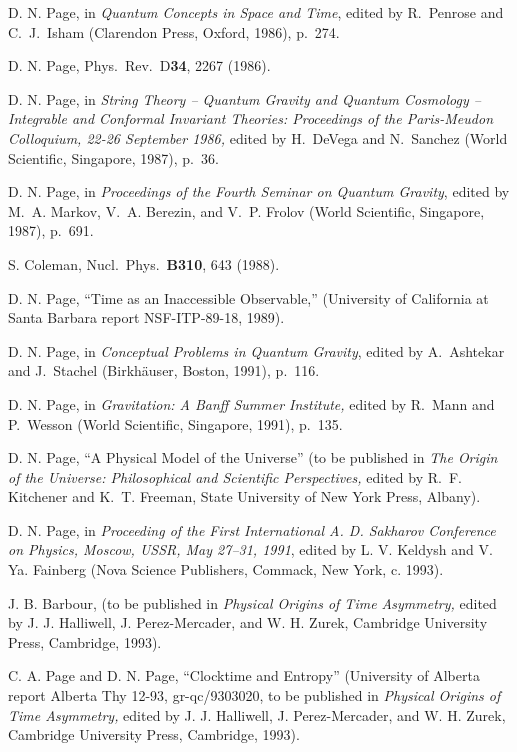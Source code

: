 \begin{thebibliography}{999}
 D. N. Page, in {\em Quantum Concepts in Space and
Time},
edited by
R.~Penrose and C.~J.~Isham (Clarendon Press, Oxford, 1986), p.~274.

 D. N. Page, Phys.\ Rev.\ D{\bf 34}, 2267 (1986).

 D. N. Page, in {\em String Theory -- Quantum Gravity
and
Quantum Cosmology -- Integrable and Conformal Invariant Theories:
Proceedings of the Paris-Meudon Colloquium, 22-26 September 1986,}
edited by
H.~DeVega and
N.~Sanchez (World Scientific, Singapore, 1987), p.~36.

 D. N. Page, in {\em Proceedings of the Fourth Seminar
on
Quantum Gravity}, edited by M.~A. Markov, V.~A. Berezin, and V.~P.
Frolov
(World Scientific, Singapore, 1987), p.~691.

 S. Coleman, Nucl.\ Phys.\ {\bf B310}, 643 (1988).

 D. N. Page, ``Time as an Inaccessible Observable,''
(University of California at Santa Barbara report NSF-ITP-89-18,
1989).

 D. N. Page, in {\em Conceptual Problems in Quantum
Gravity}, edited by A.~Ashtekar and J.~Stachel (Birkh\"auser, Boston,
1991), p.~116.

 D. N. Page, in {\em Gravitation: A Banff Summer
Institute,} edited by R.~Mann and P.~Wesson (World
Scientific, Singapore, 1991), p.~135.

 D. N. Page, ``A Physical Model of the Universe'' (to
be
published
in {\em The Origin of the Universe: Philosophical and Scientific
Perspectives,} edited by R.~F. Kitchener and K.~T. Freeman, State
University of New York Press, Albany).

 D. N. Page, in {\em Proceeding of the First
International A. D. Sakharov Conference on Physics,
Moscow, USSR, May 27--31, 1991}, edited by L. V. Keldysh
and V. Ya. Fainberg (Nova Science Publishers, Commack,
New York, c. 1993).

 J. B. Barbour, (to be published in {\it Physical
Origins of
Time
Asymmetry,} edited by J. J. Halliwell, J. Perez-Mercader, and W. H.
Zurek,
Cambridge University Press, Cambridge, 1993).

 C. A. Page and D. N. Page, ``Clocktime and Entropy''
(University of Alberta report Alberta Thy 12-93, gr-qc/9303020,
to be published in {\em Physical Origins of Time Asymmetry,}
edited by J. J. Halliwell, J. Perez-Mercader, and
W. H. Zurek, Cambridge University Press, Cambridge, 1993).


\end{thebibliography}
